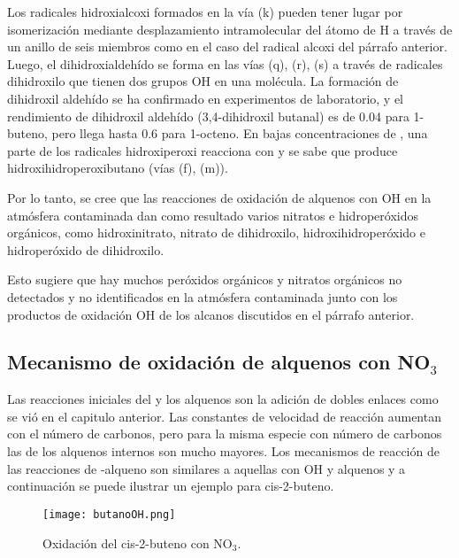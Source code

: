 {Los radicales hidroxialcoxi formados en la vía (k) pueden tener lugar por isomerización mediante desplazamiento intramolecular del átomo de H a través de un anillo de seis miembros como en el caso del radical alcoxi del párrafo anterior. Luego, el dihidroxialdehído se forma en las vías (q), (r), (s) a través de radicales dihidroxilo que tienen dos grupos OH en una molécula. La formación de dihidroxil aldehído se ha confirmado en experimentos de laboratorio, y el rendimiento de dihidroxil aldehído (3,4-dihidroxil butanal) es de 0.04 para 1-buteno, pero llega hasta 0.6 para 1-octeno. En bajas concentraciones de , una parte de los radicales hidroxiperoxi reacciona con  y se sabe que produce hidroxihidroperoxibutano (vías (f), (m)).

Por lo tanto, se cree que las reacciones de oxidación de alquenos con OH en la atmósfera contaminada dan como resultado varios nitratos e hidroperóxidos orgánicos, como hidroxinitrato, nitrato de dihidroxilo, hidroxihidroperóxido e hidroperóxido de dihidroxilo.

Esto sugiere que hay muchos peróxidos orgánicos y nitratos orgánicos no detectados y no identificados en la atmósfera contaminada junto con los productos de oxidación OH de los alcanos discutidos en el párrafo anterior.

\subsection{Mecanismo de oxidaci\'on de alquenos con NO$_3$}
Las reacciones iniciales del  y los alquenos son la adición de dobles enlaces como se vió en el capitulo anterior. Las constantes de velocidad de reacción aumentan con el número de carbonos, pero para la misma especie con número de carbonos las de los alquenos internos son mucho mayores. Los mecanismos de reacción de las reacciones de -alqueno son similares a aquellas con OH y alquenos y a continuación se puede ilustrar un ejemplo para cis-2-buteno.
\begin{figure}[htbp]
\begin{center}
\texttt{[image: butanoOH.png]}
\caption{Oxidación del cis-2-buteno con NO$_3$.}
\label{buteNO3}
\end{center}
\end{figure}

}

